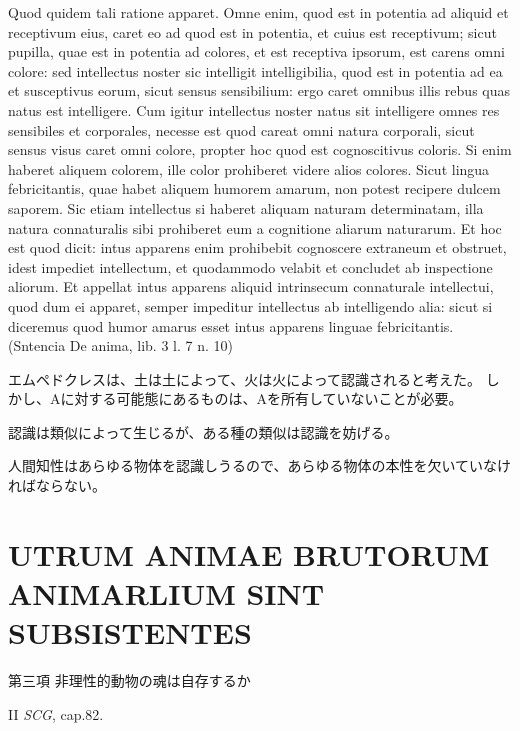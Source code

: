 \documentclass[paper=a4paper,fontsize=10pt,jafontsize=9pt,titlepage]{jlreq}
\begin{document}
 Quod quidem tali ratione apparet. Omne enim, quod est in potentia ad aliquid et receptivum eius, caret eo ad quod est in potentia, et cuius est receptivum; sicut pupilla, quae est in potentia ad colores, et est receptiva ipsorum, est carens omni colore: sed intellectus noster sic intelligit intelligibilia, quod est in potentia ad ea et susceptivus eorum, sicut sensus sensibilium: ergo caret omnibus illis rebus quas natus est intelligere. Cum igitur intellectus noster natus sit intelligere omnes res sensibiles et corporales, necesse est quod careat omni natura corporali, sicut sensus visus caret omni colore, propter hoc quod est cognoscitivus coloris. Si enim haberet aliquem colorem, ille color prohiberet videre alios colores. Sicut lingua febricitantis, quae habet aliquem humorem amarum, non potest recipere dulcem saporem. Sic etiam intellectus si haberet aliquam naturam determinatam, illa natura connaturalis sibi prohiberet eum a cognitione aliarum naturarum. Et hoc est quod dicit: intus apparens enim prohibebit cognoscere extraneum et obstruet, idest impediet intellectum, et quodammodo velabit et concludet ab inspectione aliorum. Et appellat intus apparens aliquid intrinsecum connaturale intellectui, quod dum ei apparet, semper impeditur intellectus ab intelligendo alia: sicut si diceremus quod humor amarus esset intus apparens linguae febricitantis. (Sntencia De anima, lib. 3 l. 7 n. 10)

エムペドクレスは、土は土によって、火は火によって認識されると考えた。
しかし、Aに対する可能態にあるものは、Aを所有していないことが必要。

認識は類似によって生じるが、ある種の類似は認識を妨げる。

人間知性はあらゆる物体を認識しうるので、あらゆる物体の本性を欠いていなければならない。

\newpage


\section{UTRUM ANIMAE BRUTORUM ANIMARLIUM SINT SUBSISTENTES}

{\Large 第三項 非理性的動物の魂は自存するか}

{\footnotesize II {\itshape SCG}, cap.82.}
\end{document}
